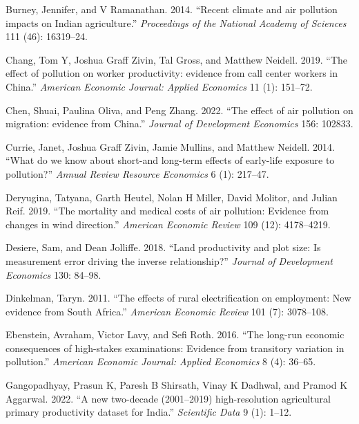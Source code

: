 \documentclass[
]{article}
\newlength{\cslhangindent}
\newlength{\cslentryspacingunit} %
\newenvironment{CSLReferences}[2] %
 {%
  \setlength{\parindent}{0pt}
  \ifodd #1
  \let\oldpar\par
  \def\par{\hangindent=\cslhangindent\oldpar}
  \fi
  \setlength{\parskip}{#2\cslentryspacingunit}
 }%
 {}
\begin{document}
\begin{CSLReferences}{1}{0}
\leavevmode{}%
Burney, Jennifer, and V Ramanathan. 2014. {``{Recent climate and air pollution impacts on Indian agriculture}.''} \emph{{Proceedings of the National Academy of Sciences}} 111 (46): 16319--24.

\leavevmode{}%
Chang, Tom Y, Joshua Graff Zivin, Tal Gross, and Matthew Neidell. 2019. {``{The effect of pollution on worker productivity: evidence from call center workers in China}.''} \emph{{American Economic Journal: Applied Economics}} 11 (1): 151--72.

\leavevmode{}%
Chen, Shuai, Paulina Oliva, and Peng Zhang. 2022. {``{The effect of air pollution on migration: evidence from China}.''} \emph{{Journal of Development Economics}} 156: 102833.

\leavevmode{}%
Currie, Janet, Joshua Graff Zivin, Jamie Mullins, and Matthew Neidell. 2014. {``{What do we know about short-and long-term effects of early-life exposure to pollution?}''} \emph{{Annual Review Resource Economics}} 6 (1): 217--47.

\leavevmode{}%
Deryugina, Tatyana, Garth Heutel, Nolan H Miller, David Molitor, and Julian Reif. 2019. {``{The mortality and medical costs of air pollution: Evidence from changes in wind direction}.''} \emph{{American Economic Review}} 109 (12): 4178--4219.

\leavevmode{}%
Desiere, Sam, and Dean Jolliffe. 2018. {``{Land productivity and plot size: Is measurement error driving the inverse relationship?}''} \emph{{Journal of Development Economics}} 130: 84--98.

\leavevmode{}%
Dinkelman, Taryn. 2011. {``{The effects of rural electrification on employment: New evidence from South Africa}.''} \emph{{American Economic Review}} 101 (7): 3078--108.

\leavevmode{}%
Ebenstein, Avraham, Victor Lavy, and Sefi Roth. 2016. {``{The long-run economic consequences of high-stakes examinations: Evidence from transitory variation in pollution}.''} \emph{{American Economic Journal: Applied Economics}} 8 (4): 36--65.

\leavevmode{}%
Gangopadhyay, Prasun K, Paresh B Shirsath, Vinay K Dadhwal, and Pramod K Aggarwal. 2022. {``{A new two-decade (2001--2019) high-resolution agricultural primary productivity dataset for India}.''} \emph{{Scientific Data}} 9 (1): 1--12.


\end{CSLReferences}
\end{document}
